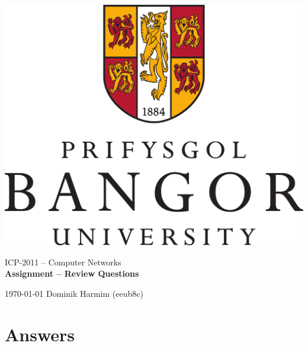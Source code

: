 \documentclass[a4paper, 11pt]{article}
\begin{document}
	\begin{titlepage}
		\begin{center}
			\includegraphics[width=0.5\linewidth]{inc/Bangor_logo.pdf} \\


			\LARGE{ICP-2011 -- Computer Networks} \\
			\Huge{\textbf{Assignment -- Review Questions}}

		\end{center}

		{\Large
			\today
			\hfill
			Dominik Harmim (eeub8c)
		}
	\end{titlepage}



	\section*{Answers}
\end{document}
